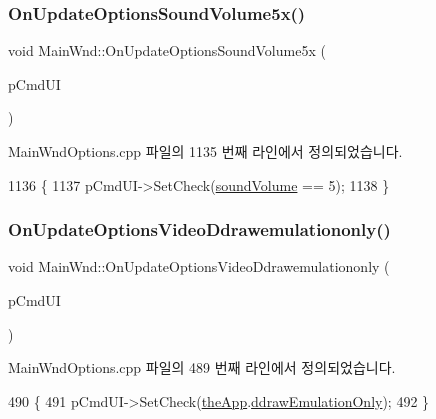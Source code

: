 \subsubsection{\texorpdfstring{On\+Update\+Options\+Sound\+Volume5x()}{OnUpdateOptionsSoundVolume5x()}}
{\footnotesize\ttfamily void Main\+Wnd\+::\+On\+Update\+Options\+Sound\+Volume5x (\begin{DoxyParamCaption}\item[{C\+Cmd\+UI $\ast$}]{p\+Cmd\+UI }\end{DoxyParamCaption})\hspace{0.3cm}{\ttfamily [protected]}}



Main\+Wnd\+Options.\+cpp 파일의 1135 번째 라인에서 정의되었습니다.


\begin{DoxyCode}
1136 \{
1137   pCmdUI->SetCheck(\mbox{\hyperlink{gb_sound_8cpp_a44346dfa73de6666c4727594bb20f6b7}{soundVolume}} == 5);
1138 \}
\end{DoxyCode}
\mbox{\label{class_main_wnd_a970b6c15909603ac56471c2275170791}} 
\subsubsection{\texorpdfstring{On\+Update\+Options\+Video\+Ddrawemulationonly()}{OnUpdateOptionsVideoDdrawemulationonly()}}
{\footnotesize\ttfamily void Main\+Wnd\+::\+On\+Update\+Options\+Video\+Ddrawemulationonly (\begin{DoxyParamCaption}\item[{C\+Cmd\+UI $\ast$}]{p\+Cmd\+UI }\end{DoxyParamCaption})\hspace{0.3cm}{\ttfamily [protected]}}



Main\+Wnd\+Options.\+cpp 파일의 489 번째 라인에서 정의되었습니다.


\begin{DoxyCode}
490 \{
491   pCmdUI->SetCheck(\mbox{\hyperlink{_v_b_a_8cpp_a8095a9d06b37a7efe3723f3218ad8fb3}{theApp}}.\mbox{\hyperlink{class_v_b_a_a18c0ee1eaa744d8061ce94ce6ed870fd}{ddrawEmulationOnly}});
492 \}
\end{DoxyCode}
\mbox{\label{class_main_wnd_a142e1ed6bc371e50341d8e60ce1afa82}} 
